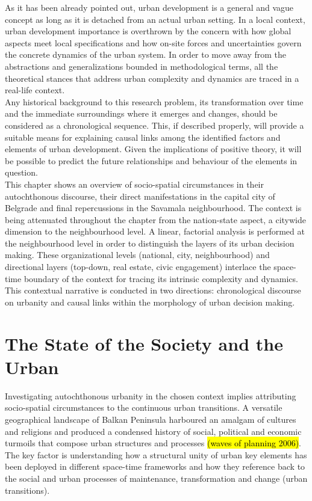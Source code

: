 \documentclass[11pt]{report}
\begin{document}
As it has been already pointed out, urban development is a general and vague concept as long as it is detached from an actual urban setting. In a local context, urban development importance is overthrown by the concern with how global aspects meet local specifications and how on-site forces and uncertainties govern the concrete dynamics of the urban system. In order to move away from the abstractions and generalizations bounded in methodological terms, all the theoretical stances that address urban complexity and dynamics are traced in a real-life context.
\\
Any historical background to this research problem, its transformation over time and the immediate surroundings where it emerges and changes, should be considered as a chronological sequence. This, if described properly, will provide a suitable means for explaining causal links among the identified factors and elements of urban development. Given the implications of positive theory, it will be possible to predict the future relationships and behaviour of the elements in question.
\\
This chapter shows an overview of socio-spatial circumstances in their autochthonous discourse, their direct manifestations in the capital city of Belgrade and final repercussions in the Savamala neighbourhood. The context is being attenuated throughout the chapter from the nation-state aspect, a citywide dimension to the neighbourhood level. A linear, factorial analysis is performed at the neighbourhood level in order to distinguish the layers of its urban decision making.
These organizational levels (national, city, neighbourhood) and directional layers (top-down, real estate, civic engagement) interlace the space-time boundary of the context for tracing its intrinsic complexity and dynamics.
This contextual narrative is conducted in two directions: chronological discourse on urbanity and causal links within the morphology of urban decision making. 

\section{The State of the Society and the Urban}


Investigating autochthonous urbanity in the chosen context implies attributing socio-spatial circumstances to the continuous urban transitions. A versatile geographical landscape of Balkan Peninsula harboured an amalgam of cultures and religions and produced a condensed history of social, political and economic turmoils that compose urban structures and processes \hl{(waves of planning 2006)}.
The key factor is understanding how a structural unity of urban key elements has been deployed in different space-time frameworks and how they reference back to the social and urban processes of maintenance, transformation and change (urban transitions).
\end{document}
